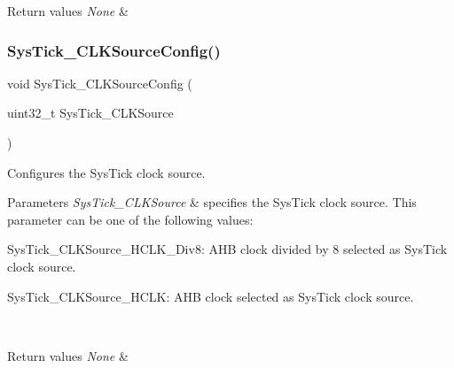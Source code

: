 \begin{DoxyRetVals}{Return values}
{\em None} & \\
\hline
\end{DoxyRetVals}
\mbox{\label{group___m_i_s_c___exported___functions_ga2777d255bb06ad62bb6372a9db1ff385}} 
\subsubsection{\texorpdfstring{SysTick\_CLKSourceConfig()}{SysTick\_CLKSourceConfig()}}
{\footnotesize\ttfamily void Sys\+Tick\+\_\+\+C\+L\+K\+Source\+Config (\begin{DoxyParamCaption}\item[{uint32\+\_\+t}]{Sys\+Tick\+\_\+\+C\+L\+K\+Source }\end{DoxyParamCaption})}



Configures the Sys\+Tick clock source. 


\begin{DoxyParams}{Parameters}
{\em Sys\+Tick\+\_\+\+C\+L\+K\+Source} & specifies the Sys\+Tick clock source. This parameter can be one of the following values\+: \begin{DoxyItemize}
\item Sys\+Tick\+\_\+\+C\+L\+K\+Source\+\_\+\+H\+C\+L\+K\+\_\+\+Div8\+: A\+HB clock divided by 8 selected as Sys\+Tick clock source. \item Sys\+Tick\+\_\+\+C\+L\+K\+Source\+\_\+\+H\+C\+LK\+: A\+HB clock selected as Sys\+Tick clock source. \end{DoxyItemize}
\\
\hline
\end{DoxyParams}

\begin{DoxyRetVals}{Return values}
{\em None} & \\
\hline
\end{DoxyRetVals}
